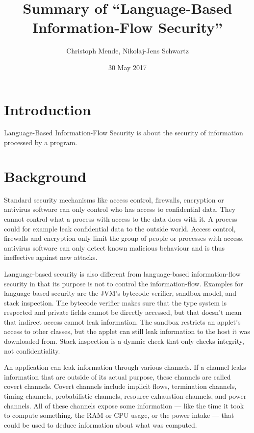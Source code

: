 \documentclass[acmlarge]{acmart}
\begin{document}

\title{Summary of ``Language-Based Information-Flow Security''\cite{Sabelfeld:2006:LIS:2312191.2314769}}
\author{Christoph Mende, Nikolaj-Jens Schwartz}
\date{30 May 2017}
\maketitle

\section{Introduction}

Language-Based Information-Flow Security is about the security of information processed by a program.

\section{Background}

Standard security mechanisms like access control, firewalls, encryption or antivirus software can only control who has access to confidential data. They cannot control what a process with access to the data does with it. A process could for example leak confidential data to the outside world. Access control, firewalls and encryption only limit the group of people or processes with access, antivirus software can only detect known malicious behaviour and is thus ineffective against new attacks.

Language-based security is also different from language-based information-flow security in that its purpose is not to control the information-flow. Examples for language-based security are the JVM's bytecode verifier, sandbox model, and stack inspection. The bytecode verifier makes sure that the type system is respected and private fields cannot be directly accessed, but that doesn't mean that indirect access cannot leak information. The sandbox restricts an applet's access to other classes, but the applet can still leak information to the host it was downloaded from. Stack inspection is a dynmic check that only checks integrity, not confidentiality.

An application can leak information through various channels. If a channel leaks information that are outside of its actual purpose, these channels are called covert channels. Covert channels include implicit flows, termination channels, timing channels, probabilistic channels, resource exhaustion channels, and power channels. All of these channels expose some information --- like the time it took to compute something, the RAM or CPU usage, or the power intake --- that could be used to deduce information about what was computed.
\end{document}
